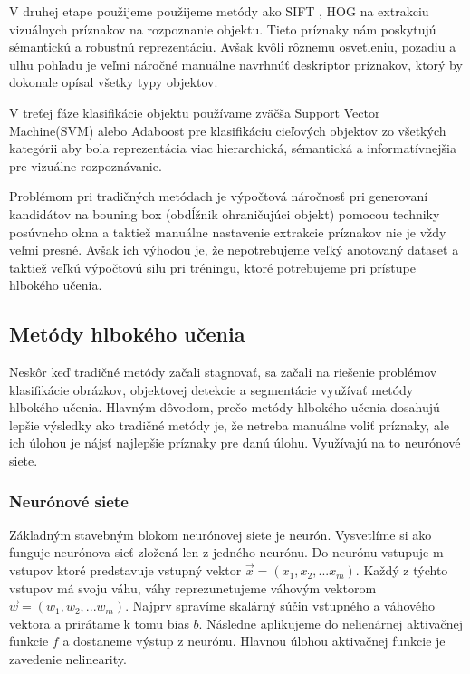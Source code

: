 V druhej etape použijeme použijeme metódy ako SIFT \cite{SIFT}, HOG \cite{HOG} na extrakciu vizuálnych príznakov na rozpoznanie objektu. Tieto príznaky nám poskytujú sémantickú a robustnú reprezentáciu. Avšak kvôli rôznemu osvetleniu, pozadiu a ulhu pohľadu je veľmi náročné manuálne navrhnúť deskriptor príznakov, ktorý by dokonale opísal všetky typy objektov. 

V treťej fáze klasifikácie objektu používame zväčša Support Vector Machine(SVM) \cite{SVM} alebo Adaboost \cite{Adaboost} pre klasifikáciu cieľových objektov zo všetkých kategórii aby bola reprezentácia viac hierarchická, sémantická a informatívnejšia pre vizuálne rozpoznávanie. 

Problémom pri tradičných metódach je výpočtová náročnosť pri generovaní kandidátov na bouning box (obdĺžnik ohraničujúci objekt) pomocou techniky posúvneho okna a taktiež manuálne nastavenie extrakcie príznakov nie je vždy veľmi presné. Avšak ich výhodou je, že nepotrebujeme veľký anotovaný dataset a taktiež veľkú výpočtovú silu pri tréningu, ktoré potrebujeme pri prístupe hlbokého učenia.

\subsection{Metódy hlbokého učenia}
\hspace{\parindent} Neskôr keď tradičné metódy začali stagnovať, sa začali na riešenie problémov klasifikácie obrázkov, objektovej detekcie a segmentácie využívať metódy hlbokého učenia. Hlavným dôvodom, prečo metódy hlbokého učenia dosahujú lepšie výsledky ako tradičné metódy je, že netreba manuálne voliť príznaky, ale ich úlohou je nájsť najlepšie príznaky pre danú úlohu. Využívajú na to neurónové siete. 

\subsubsection{Neurónové siete}
\hspace{\parindent} Základným stavebným blokom neurónovej siete je neurón. Vysvetlíme si ako funguje neurónova sieť zložená len z jedného neurónu. Do neurónu vstupuje m vstupov ktoré predstavuje vstupný vektor $\vec{x} = (x_1, x_2, ...  x_m)$. Každý z týchto vstupov má svoju váhu, váhy reprezunetujeme váhovým vektorom $\vec{w} = (w_1, w_2, ...  w_m)$. Najprv spravíme skalárný súčin vstupného a váhového vektora a prirátame k tomu bias $b$. Následne aplikujeme do nelienárnej aktivačnej funkcie $f$ a dostaneme výstup z neurónu. Hlavnou úlohou aktivačnej funkcie je zavedenie nelinearity. 

